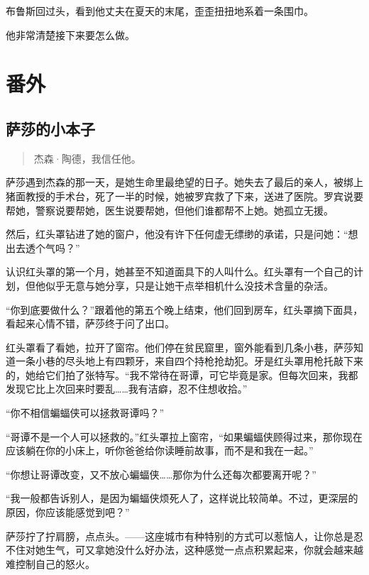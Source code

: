 \documentclass[../main]{subfiles}
\begin{document}
布鲁斯回过头，看到他丈夫在夏天的末尾，歪歪扭扭地系着一条围巾。

他非常清楚接下来要怎么做。

\storyend[正文完]


\section*{番外}

\subsection{萨莎的小本子}

\begin{quote}
    杰森·陶德，我信任他。
\end{quote}

萨莎遇到杰森的那一天，是她生命里最绝望的日子。她失去了最后的亲人，被绑上猪面教授的手术台，死了一半的时候，她被罗宾救了下来，送进了医院。罗宾说要帮她，警察说要帮她，医生说要帮她，但他们谁都帮不上她。她孤立无援。

然后，红头罩钻进了她的窗户，他没有许下任何虚无缥缈的承诺，只是问她：“想出去透个气吗？”

认识红头罩的第一个月，她甚至不知道面具下的人叫什么。红头罩有一个自己的计划，但他似乎无意与她分享，只是让她干点举相机什么没技术含量的杂活。

“你到底要做什么？”跟着他的第五个晚上结束，他们回到房车，红头罩摘下面具，看起来心情不错，萨莎终于问了出口。

红头罩看了看她，拉开了窗帘。他们停在贫民窟里，窗外能看到几条小巷，萨莎知道一条小巷的尽头地上有四颗牙，来自四个持枪抢劫犯。牙是红头罩用枪托敲下来的，她给它们拍了张特写。“我不常待在哥谭，可它毕竟是家。但每次回来，我都发现它比上次回来时要乱……我有洁癖，忍不住想收拾。”

“你不相信蝙蝠侠可以拯救哥谭吗？”

“哥谭不是一个人可以拯救的。”红头罩拉上窗帘，“如果蝙蝠侠顾得过来，那你现在应该躺在你的小床上，听你爸爸给你读睡前故事，而不是和我在一起。”

“你想让哥谭改变，又不放心蝙蝠侠……那你为什么还每次都要离开呢？”

“我一般都告诉别人，是因为蝙蝠侠烦死人了，这样说比较简单。不过，更深层的原因，你应该能感觉到吧？”

萨莎拧了拧肩膀，点点头。——这座城市有种特别的方式可以惹恼人，让你总是忍不住对她生气，可又拿她没什么好办法，这种感觉一点点积累起来，你就会越来越难控制自己的怒火。
\end{document}
